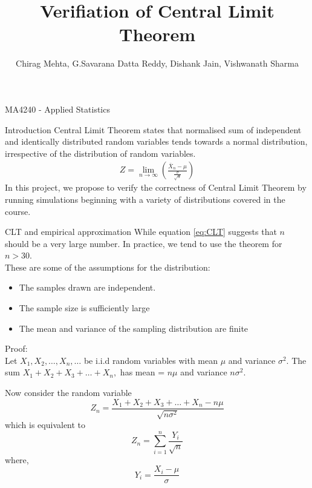 \documentclass{beamer}
\title{Verifiation of Central Limit Theorem}
\author[]{Chirag Mehta, G.Savarana Datta Reddy, Dishank Jain, Vishwanath Sharma}
\institute{Indian Institute Of Technology, Hyderabad}
\date{}
\begin{document}
\begin{frame}{MA4240 - Applied Statistics}
\titlepage
\end{frame}

\begin{frame}{Introduction}
Central Limit Theorem states that normalised sum of independent and identically distributed random variables tends towards a normal distribution, irrespective of the distribution of random variables.
\begin{align}
    Z = \lim_{n \to \infty} \left(\frac{\bar{X}_n-\mu}{\frac{\sigma}{\sqrt{n}}}\right) \label{eq:CLT}
\end{align}
In this project, we propose to verify the correctness of Central Limit Theorem by running simulations beginning with a variety of distributions covered in the course.
\end{frame}



\begin{frame}{CLT and empirical approximation}
    While equation \eqref{eq:CLT} suggests that $n$ should be a very large number. In practice, we tend to use the theorem for $n>30$.\\
These are some of the assumptions for the distribution:
\begin{itemize}
\item  The samples drawn are independent.
\item  The sample size is sufficiently large
\item  The mean and variance of the sampling distribution are finite
\end{itemize}
\end{frame}



\begin{frame}{}
Proof:\\
Let $X_1,X_2,\dots,X_n,\dots$ be i.i.d random variables with mean $\mu$ and variance $\sigma^2$.
The sum $X_1+X_2+X_3+\dots+X_n,$ has mean = $n\mu$ and variance $n\sigma^2$.

Now consider the random variable 
\begin{equation}
    Z_n = \frac{X_1+X_2+X_3+\dots+X_n - n\mu}{\sqrt{n\sigma^2}}
\end{equation}
which is equivalent to 
\begin{equation}
    Z_n = \sum_{i=1}^n \frac{Y_i}{\sqrt{n}}
\end{equation}
where,
\begin{equation}
    Y_i = \frac{X_i-\mu}{\sigma}\label{a}
\end{equation}
\end{frame}
\end{document}

